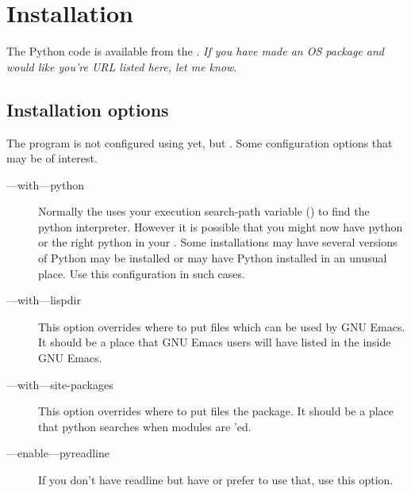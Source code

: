 \section{Installation}

The Python code is available from the .
{\em If you have made an OS package and would like you're URL listed
here, let me know}.

\subsection{Installation options}

The program is not configured using  yet, but
. Some configuration options that may be of interest.

\begin{description} 

\item[--{}--with--{}--python]

Normally the  uses your execution search-path variable
() to find the python interpreter. However it is possible
that you might now have python or the right python in your
.  Some installations may have several versions of Python
may be installed or may have Python installed in an unusual place. Use
this configuration in such cases.

\item[--{}--with--{}--lispdir]

This option overrides where to put files which can be used by GNU Emacs. It
should be a place that GNU Emacs users will have listed in the
 inside GNU Emacs.

\item[--{}--with--{}--site-packages]

This option overrides where to put files the  package.  It
should be a place that python searches when modules are
'ed.

\item[--{}--enable--{}--pyreadline]

If you don't have readline but have  or prefer to use
that, use this option.

\end{description}
